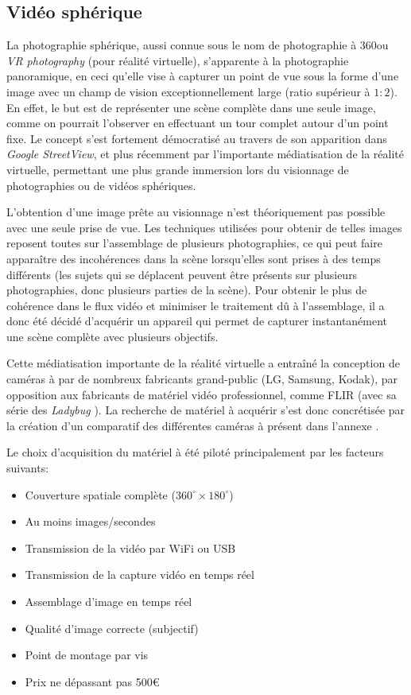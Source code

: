 		\subsection{Vidéo sphérique}
			La photographie sphérique, aussi connue sous le nom de photographie à 360\degre ou \emph{VR photography} (pour réalité virtuelle), s'apparente à la photographie panoramique, en ceci qu'elle vise à capturer un point de vue sous la forme d'une image avec un champ de vision exceptionnellement large (ratio supérieur à $1:2$)\cite{fnumpano}. En effet, le but est de représenter une scène complète dans une seule image, comme on pourrait l'observer en effectuant un tour complet autour d'un point fixe. Le concept s'est fortement démocratisé au travers de son apparition dans \emph{Google StreetView}, et plus récemment par l'importante médiatisation de la réalité virtuelle, permettant une plus grande immersion lors du visionnage de photographies ou de vidéos sphériques.
			\par
			L'obtention d'une image prête au visionnage n'est théoriquement pas possible avec une seule prise de vue. Les techniques utilisées pour obtenir de telles images reposent toutes sur l'assemblage de plusieurs photographies, ce qui peut faire apparaître des incohérences dans la scène lorsqu'elles sont prises à des temps différents (les sujets qui se déplacent peuvent être présents sur plusieurs photographies, donc plusieurs parties de la scène). Pour obtenir le plus de cohérence dans le flux vidéo et minimiser le traitement dû à l'assemblage, il a donc été décidé d'acquérir un appareil qui permet de capturer instantanément une scène complète avec plusieurs objectifs.
			\par
			Cette médiatisation importante de la réalité virtuelle a entraîné la conception de caméras à \degre par de nombreux fabricants grand-public (LG, Samsung, Kodak), par opposition aux fabricants de matériel vidéo professionnel, comme FLIR (avec sa série des \emph{Ladybug} \cite{ladybug}). La recherche de matériel à acquérir s'est donc concrétisée par la création d'un comparatif des différentes caméras à \degre présent dans l'annexe \todoref.
			
			Le choix d'acquisition du matériel à été piloté principalement par les facteurs suivants:
			\begin{itemize}[noitemsep]
				\item Couverture spatiale complète ($360^{\circ}\times180^{\circ}$)
				\item Au moins  images/secondes
				\item Transmission de la vidéo par WiFi ou USB
				\item Transmission de la capture vidéo en temps réel
				\item Assemblage d'image en temps réel
				\item Qualité d'image correcte (subjectif)
				\item Point de montage par vis
				\item Prix ne dépassant pas 500\euro
			\end{itemize}
			
